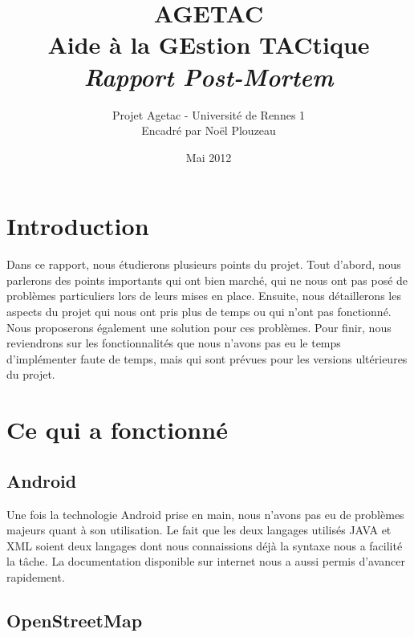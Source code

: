 \documentclass{article}
\title{\Huge{AGETAC\\
Aide à la GEstion TACtique\\}
\huge{{\color{color02} \textit{Rapport Post-Mortem}}}}
\date{Mai 2012}
\author{Projet Agetac - Université de Rennes 1\\
Encadré par Noël Plouzeau}
\begin{document}
\maketitle

%
%
%

\vspace{1in}
\tableofcontents
\newpage

\section{Introduction}

Dans ce rapport, nous étudierons plusieurs points du projet. Tout d’abord, nous parlerons des points importants qui ont bien marché, qui ne nous ont pas posé de problèmes particuliers lors de leurs mises en place. Ensuite, nous détaillerons les aspects du projet qui nous ont pris plus de temps ou qui n’ont pas fonctionné. Nous proposerons également une solution pour ces problèmes. Pour finir, nous reviendrons sur les fonctionnalités que nous n’avons pas eu le temps d’implémenter faute de temps, mais qui sont prévues pour les versions ultérieures du projet.

\section{Ce qui a fonctionné}


\subsection{Android}

Une fois la technologie Android prise en main, nous n’avons pas eu de problèmes majeurs quant à son utilisation. Le fait que les deux langages utilisés JAVA et XML soient deux langages dont nous connaissions déjà la syntaxe nous a facilité la tâche. La documentation disponible sur internet nous a aussi permis d’avancer rapidement.  

\subsection{OpenStreetMap}
\end{document}
